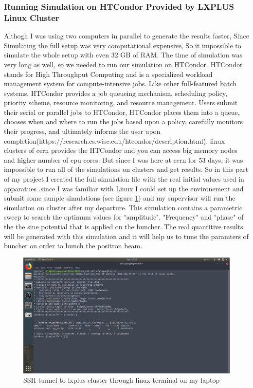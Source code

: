 \documentclass[12pt,a4paper]{article}
\begin{document}
\subsubsection{Running Simulation on HTCondor Provided by LXPLUS Linux Cluster}
Althogh I was using two computers in parallel to generate the results faster, Since Simulating the full setup was very computational expensive, So it impossible to simulate the whole setup with even 32 GB of RAM. The time of simulation was very long as well, so we needed to run our simulation on HTCondor. HTCondor  stands for High Throughput Computing and is a specialized workload management system for compute-intensive jobs. Like other full-featured batch systems, HTCondor provides a job queueing mechanism, scheduling policy, priority scheme, resource monitoring, and resource management. Users submit their serial or parallel jobs to HTCondor, HTCondor places them into a queue, chooses when and where to run the jobs based upon a policy, carefully monitors their progress, and ultimately informs the user upon completion(https://research.cs.wisc.edu/htcondor/description.html). linux clusters of cern provides the HTCondor and you can access big memory nodes and higher number of cpu cores. But since I was here at cern for 53 days, it was impossible to run all of the simulations on clusters and get results. So in this part of my project I created the full simulation file with the real initial values used in apparatues .since I was familiar with Linux I could set up the environement and submit some sample simulations (see figure \ref{cluster}) and my supervisor will run the simulation on cluster after my departure. This simulation contains a parametric sweep to search the optimum values for "amplitude", "Frequency" and "phase" of the the sine potential that is applied on the buncher. The real quantitive results will be generated with this simulation and it will help us to tune the paramters of buncher on order to bunch the positron beam.

\begin{figure}[h!]
\centering
\includegraphics[scale=0.26]{lxplus}
\caption{SSH tunnel to lxplus cluster through linux terminal on my laptop}
\label{cluster}
\end{figure}
\end{document}
